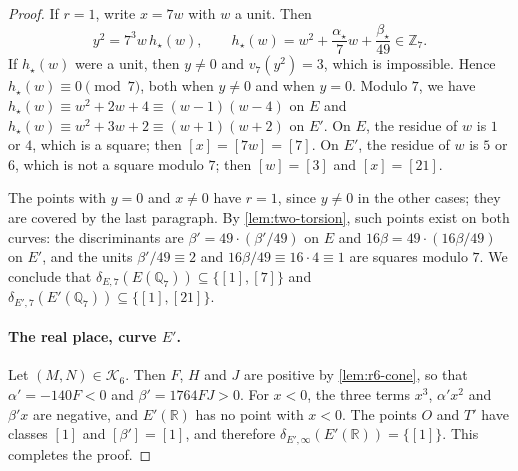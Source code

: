 \documentclass[12pt,oneside,openany]{book}
\theoremstyle{definition}
\theoremstyle{plain}
\numberwithin{equation}{chapter}
\theoremstyle{plain}
\theoremstyle{definition}
\theoremstyle{remark}
\newcommand{\Q}{\mathbb Q}
\newcommand{\Z}{\mathbb Z}
\newcommand{\R}{\mathbb R}
\newcommand{\sq}[1]{[#1]}
\newcommand{\cK}{\mathcal K}
\begin{document}
\begin{proof}
If $r=1$, write $x=7w$ with $w$ a unit. Then
\[
y^2=7^3w\,h_\star(w),\qquad h_\star(w)=w^2+\frac{\alpha_\star}{7}w+\frac{\beta_\star}{49}\in\Z_7.
\]
If $h_\star(w)$ were a unit, then $y\ne0$ and $v_7(y^2)=3$, which is impossible. Hence $h_\star(w)\equiv0\pmod 7$, both when $y\ne0$ and when $y=0$. Modulo $7$, we have $h_\star(w)\equiv w^2+2w+4\equiv(w-1)(w-4)$ on $E$ and $h_\star(w)\equiv w^2+3w+2\equiv(w+1)(w+2)$ on $E'$. On $E$, the residue of $w$ is $1$ or $4$, which is a square; then $\sq x=\sq{7w}=\sq7$. On $E'$, the residue of $w$ is $5$ or $6$, which is not a square modulo $7$; then $\sq w=\sq3$ and $\sq x=\sq{21}$.

The points with $y=0$ and $x\ne0$ have $r=1$, since $y\ne0$ in the other cases; they are covered by the last paragraph. By \cref{lem:two-torsion}, such points exist on both curves: the discriminants are $\beta'=49\cdot(\beta'/49)$ on $E$ and $16\beta=49\cdot(16\beta/49)$ on $E'$, and the units $\beta'/49\equiv2$ and $16\beta/49\equiv16\cdot4\equiv1$ are squares modulo $7$. We conclude that $\delta_{E,7}(E(\Q_7))\subseteq\{\sq1,\sq7\}$ and $\delta_{E',7}(E'(\Q_7))\subseteq\{\sq1,\sq{21}\}$.

\paragraph{The real place, curve $E'$.} Let $(M,N)\in\cK_6$. Then $F$, $H$ and $J$ are positive by \cref{lem:r6-cone}, so that $\alpha'=-140F<0$ and $\beta'=1764FJ>0$. For $x<0$, the three terms $x^3$, $\alpha'x^2$ and $\beta'x$ are negative, and $E'(\R)$ has no point with $x<0$. The points $O$ and $T'$ have classes $\sq1$ and $\sq{\beta'}=\sq1$, and therefore $\delta_{E',\infty}(E'(\R))=\{\sq1\}$. This completes the proof.
\end{proof}
\end{document}

